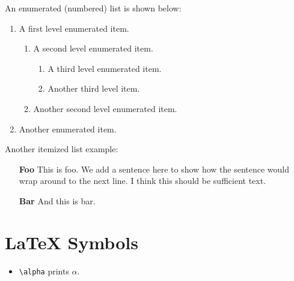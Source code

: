 \documentclass{article}
\begin{document}
\vspace{12pt}
An enumerated (numbered) list is shown below:
\begin{enumerate}
    \item A first level enumerated item.
    \begin{enumerate}
        \item A second level enumerated item.
        \begin{enumerate}
            \item A third level enumerated item.
            \item Another third level item.
        \end{enumerate}
        \item Another second level enumerated item.
    \end{enumerate}
    \item Another enumerated item.
\end{enumerate}

Another itemized list example:
\begin{enumerate}
    \item[\bfseries{Foo}] This is foo.  We add a sentence here to show how the sentence would
    wrap around to the next line.  I think this should be sufficient text.
    \item[\bfseries{Bar}] And this is bar.
\end{enumerate}

\cleardoublepage

\section{LaTeX Symbols}
\begin{itemize}
    \item \texttt{\textbackslash alpha} prints $\alpha$.
\end{itemize}
\end{document}
